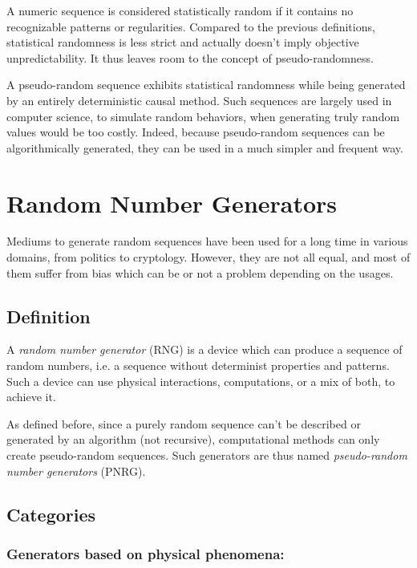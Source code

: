 \documentclass{llncs}
\begin{document}
A numeric sequence is considered statistically random if it contains no recognizable patterns or regularities. Compared to the previous definitions, statistical randomness is less strict and actually doesn't imply objective unpredictability. It thus leaves room to the concept of pseudo-randomness.

 A pseudo-random sequence exhibits statistical randomness while being generated by an entirely deterministic causal method. Such sequences are largely used in computer science, to simulate random behaviors, when generating truly random values would be too costly. Indeed, because pseudo-random sequences can be algorithmically generated, they can be used in a much simpler and frequent way.

\section{Random Number Generators}
\label{sec:rng}

Mediums to generate random sequences have been used for a long time in various domains, from politics to cryptology. However, they are not all equal, and most of them suffer from bias which can be or not a problem depending on the usages.

\subsection{Definition}

A \emph{random number generator} (RNG) is a device which can produce a sequence of random numbers, i.e. a sequence without determinist properties and patterns. Such a device can use physical interactions, computations, or a mix of both, to achieve it.

As defined before, since a purely random sequence can't be described or generated by an algorithm (not recursive), computational methods can only create pseudo-random sequences. Such generators are thus named \emph{pseudo-random number generators} (PNRG).

\subsection{Categories}

\subsubsection{Generators based on physical phenomena:}
\end{document}
